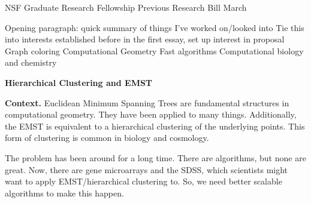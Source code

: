\documentclass[twoside,leqno, 12pt]{article}
\date{}
\begin{document}
\begin{center}
\LARGE{NSF Graduate Research Fellowship Previous Research} \newline
\Large{Bill March}
\end{center}




Opening paragraph: quick summary of things I've worked on/looked into
Tie this into interests established before in the first essay, set up interest in proposal
Graph coloring
Computational Geometry
Fast algorithms
Computational biology and chemistry

	

\textbf{Hierarchical Clustering and EMST}

\textbf{Context.}
Euclidean Minimum Spanning Trees are fundamental structures in computational geometry.  They have been applied to many things.  Additionally, the EMST is equivalent to a hierarchical clustering of the underlying points.  This form of clustering is common in biology and cosmology.  

The problem has been around for a long time.  There are algorithms, but none are great.  Now, there are gene microarrays and the SDSS, which scientists might want to apply EMST/hierarchical clustering to.  So, we need better scalable algorithms to make this happen.
\end{document}
